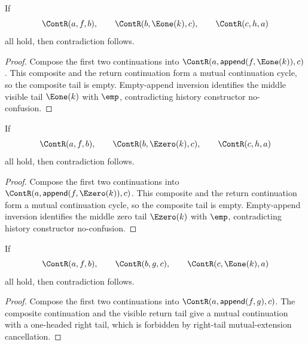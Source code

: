 \begin{theorem}
\label{thm:cont-triangle-cycle-middle-visible-tail-absurd}
If
$$
\ContR(a,f,b),\qquad
\ContR(b,\Eone(k),c),\qquad
\ContR(c,h,a)
$$
all hold, then contradiction follows.
\end{theorem}
\begin{proof}
Compose the first two continuations into
$\ContR(a,\mathsf{append}(f,\Eone(k)),c)$. This composite and the return
continuation form a mutual continuation cycle, so the composite tail is empty.
Empty-append inversion identifies the middle visible tail $\Eone(k)$ with
$\emp$, contradicting history constructor no-confusion.
\end{proof}

\begin{theorem}
\label{thm:cont-triangle-cycle-middle-zero-tail-absurd}
If
$$
\ContR(a,f,b),\qquad
\ContR(b,\Ezero(k),c),\qquad
\ContR(c,h,a)
$$
all hold, then contradiction follows.
\end{theorem}
\begin{proof}
Compose the first two continuations into
$\ContR(a,\mathsf{append}(f,\Ezero(k)),c)$. This composite and the return
continuation form a mutual continuation cycle, so the composite tail is empty.
Empty-append inversion identifies the middle zero tail $\Ezero(k)$ with
$\emp$, contradicting history constructor no-confusion.
\end{proof}

\begin{theorem}
\label{thm:cont-triangle-cycle-right-visible-tail-absurd}
If
$$
\ContR(a,f,b),\qquad
\ContR(b,g,c),\qquad
\ContR(c,\Eone(k),a)
$$
all hold, then contradiction follows.
\end{theorem}
\begin{proof}
Compose the first two continuations into
$\ContR(a,\mathsf{append}(f,g),c)$. The composite continuation and the visible
return tail give a mutual continuation with a one-headed right tail, which is
forbidden by right-tail mutual-extension cancellation.
\end{proof}

